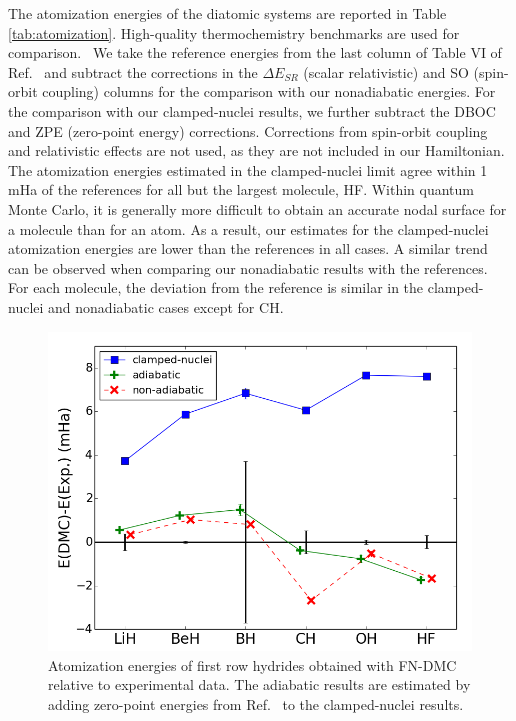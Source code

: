 \documentclass[aip,jcp,numerical,reprint]{revtex4-1}
\begin{document}
The atomization energies of the diatomic systems are reported in Table \ref{tab:atomization}. High-quality thermochemistry benchmarks are used for comparison.~\cite{Feller_Corrections} We take the reference energies from the last column of Table VI of Ref.~\cite{Feller_Corrections} and subtract the corrections in the $\Delta E_{SR}$ (scalar relativistic) and SO (spin-orbit coupling) columns for the comparison with our nonadiabatic energies. For the comparison with our clamped-nuclei results, we further subtract the DBOC and ZPE (zero-point energy) corrections. Corrections from spin-orbit coupling and relativistic effects are not used, as they are not included in our Hamiltonian. The atomization energies estimated in the clamped-nuclei limit agree within 1 mHa of the references for all but the largest molecule, HF. Within quantum Monte Carlo, it is generally more difficult to obtain an accurate nodal surface for a molecule than for an atom. As a result, our estimates for the clamped-nuclei atomization energies are lower than the references in all cases. A similar trend can be observed when comparing our nonadiabatic results with the references. For each molecule, the deviation from the reference is similar in the clamped-nuclei and nonadiabatic cases except for CH.

\begin{figure}[h]
\centering
\includegraphics[scale=.4]{atomization}
\caption{Atomization energies of first row hydrides obtained with FN-DMC relative to experimental data. The adiabatic results are estimated by adding zero-point energies from Ref.~\cite{Feller_Corrections} to the clamped-nuclei results. \label{fig:atomization}}
\end{figure}
\end{document}
